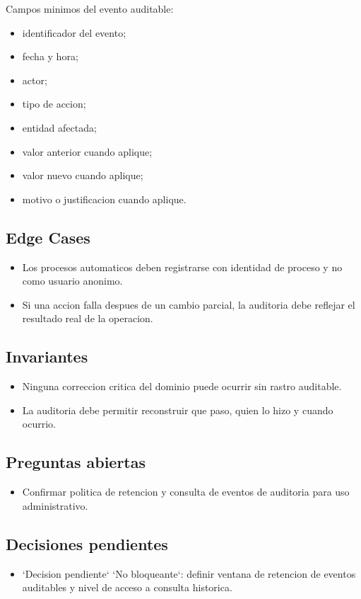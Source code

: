 Campos minimos del evento auditable:

\begin{itemize}
  \item identificador del evento;
  \item fecha y hora;
  \item actor;
  \item tipo de accion;
  \item entidad afectada;
  \item valor anterior cuando aplique;
  \item valor nuevo cuando aplique;
  \item motivo o justificacion cuando aplique.
\end{itemize}

\subsection{Edge Cases}

\begin{itemize}
  \item Los procesos automaticos deben registrarse con identidad de proceso y no como usuario anonimo.
  \item Si una accion falla despues de un cambio parcial, la auditoria debe reflejar el resultado real de la operacion.
\end{itemize}

\subsection{Invariantes}

\begin{itemize}
  \item Ninguna correccion critica del dominio puede ocurrir sin rastro auditable.
  \item La auditoria debe permitir reconstruir que paso, quien lo hizo y cuando ocurrio.
\end{itemize}

\subsection{Preguntas abiertas}

\begin{itemize}
  \item Confirmar politica de retencion y consulta de eventos de auditoria para uso administrativo.
\end{itemize}

\subsection{Decisiones pendientes}

\begin{itemize}
  \item `Decision pendiente` `No bloqueante`: definir ventana de retencion de eventos auditables y nivel de acceso a consulta historica.
\end{itemize}
